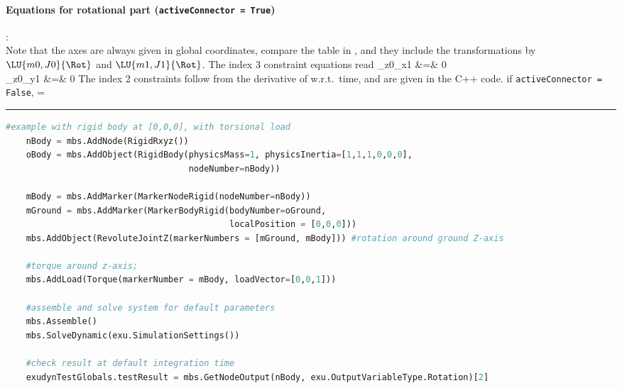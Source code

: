     \paragraph{Equations for rotational part (\texttt{activeConnector = True})}:\\
    Note that the axes are always given in global coordinates, compare the table in ,
    and they include the transformations by $\LU{m0,J0}{\Rot}$ and $\LU{m1,J1}{\Rot}$.
    The index 3 constraint equations read
    \bea \label{eq:ObjectJointRevoluteZ:index3}
       _{z0}\tp {}_{x1} &=& 0 \\
       _{z0}\tp {}_{y1} &=& 0
    \eea
    The index 2 constraints follow from the derivative of  w.r.t.\ time, and are given in the C++ code.
    if \texttt{activeConnector = False}, 
    \be
      \zv = \Null
    \ee
\vspace{6pt}\par\noindent\rule{\textwidth}{0.4pt}
\label{miniExample_ObjectJointRevoluteZ}
\pythonstyle
\begin{lstlisting}[language=Python, firstnumber=1]
    #example with rigid body at [0,0,0], with torsional load
    nBody = mbs.AddNode(RigidRxyz())
    oBody = mbs.AddObject(RigidBody(physicsMass=1, physicsInertia=[1,1,1,0,0,0], 
                                    nodeNumber=nBody))
    
    mBody = mbs.AddMarker(MarkerNodeRigid(nodeNumber=nBody))
    mGround = mbs.AddMarker(MarkerBodyRigid(bodyNumber=oGround, 
                                            localPosition = [0,0,0]))
    mbs.AddObject(RevoluteJointZ(markerNumbers = [mGround, mBody])) #rotation around ground Z-axis

    #torque around z-axis; 
    mbs.AddLoad(Torque(markerNumber = mBody, loadVector=[0,0,1])) 

    #assemble and solve system for default parameters
    mbs.Assemble()
    mbs.SolveDynamic(exu.SimulationSettings())
    
    #check result at default integration time
    exudynTestGlobals.testResult = mbs.GetNodeOutput(nBody, exu.OutputVariableType.Rotation)[2]
\end{lstlisting}

